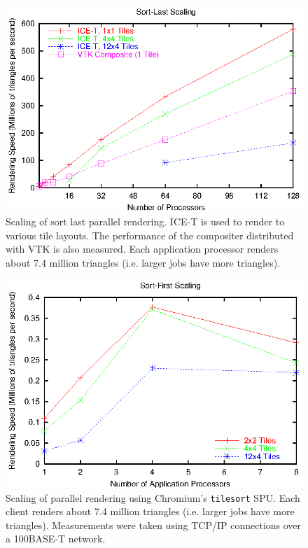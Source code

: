 \documentclass[letterpaper]{acmsiggraph}
\newcommand{\cidentifier}[1]{\texttt{#1}}
\begin{document}
  \begin{figure}
    \includegraphics[width=\linewidth]{images/scaling_icet_weak}
    \caption{Scaling of sort last parallel rendering.  ICE-T is used to
      render to various tile layouts.  The performance of the compositer
      distributed with VTK is also measured.  Each application processor
      renders about 7.4 million triangles (i.e. larger jobs have more
      triangles).}
    \label{fig:ice-t}
  \end{figure}

  \begin{figure}
    \includegraphics[width=\linewidth]{images/scaling_chromium}
    \caption{Scaling of parallel rendering using Chromium's
      \cidentifier{tile\-sort} SPU.  Each client renders about 7.4 million
      triangles (i.e. larger jobs have more triangles).  Measurements were
      taken using TCP/IP connections over a 100BASE-T network.}
    \label{fig:chromium}
  \end{figure}
\end{document}
